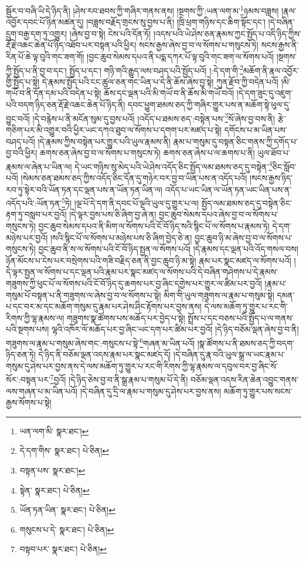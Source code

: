སྦྱོར་བ་བཞི་ཡི་དེ་ཉིད་ནི། །ཤེས་རབ་ཐབས་ཀྱི་གཞིར་གནས་ནས། །སྔགས་ཀྱི་:ཡན་ལག་མ་\footnote{ཡན་ལག་མི་  སྣར་ཐང་། }ཉམས་བཟླས། །རྣལ་འབྱོར་དབང་པོ་ཉིན་མཚན་དུ། །བཟླས་བརྗོད་གྲངས་སུ་བྱས་པ་ནི། །ཁྲི་ཕྲག་གཉིས་དང་ཆིག་སྟོང་དང་། །དེ་བཞིན་དྲུག་བརྒྱ་དག་ཏུ་འགྱུར། །ཞེས་བྱ་བ་སྟེ། ངེས་པའི་དོན་ཏོ། །འདས་པའི་ཡེ་ཤེས་ཅན་རྣམས་ཀྱང་སྤྱོད་པ་འདི་ཉིད་ཀྱིས་རྡོ་རྗེ་འཆང་ཆེན་པོ་ཉིད་འཐོབ་པར་བསྟན་པའི་ཕྱིར། སངས་རྒྱས་ཞེས་བྱ་བ་ལ་སོགས་པ་གསུངས་ཏེ། སངས་རྒྱས་ནི་རིན་པོ་ཆེ་ལྟ་བུའི་གང་ཟག་གོ། །བྱང་ཆུབ་སེམས་དཔའ་ནི་པདྨ་དཀར་པོ་ལྟ་བུའི་གང་ཟག་ལ་སོགས་པའོ། །སྔགས་ཀྱི་སྤྱོད་པ་ནི་བྱ་བ་དང་། སྤྱོད་པ་དང་། གཉི་གའི་རྒྱུད་ལས་བཤད་པའི་སྤྱོད་པའོ། །:དེ་དག་གི་\footnote{དེ་དག་གིས་  སྣར་ཐང་།  པེ་ཅིན། }མཆོག་ནི་རྣལ་འབྱོར་གྱི་སྤྱོད་པ་སྟེ། དེ་རྣམས་སྤྱོད་པའི་ངང་ཚུལ་ཅན་གང་ཡིན་པ་དེ་ནི་ཆོས་ཞེས་བྱ་སྟེ། ཀུན་རྫོབ་ཀྱི་བདེན་པའོ། །མི་གཡོ་བ་ནི་དོན་དམ་པའི་བདེན་པ་སྟེ། ཆོས་དང་ལྡན་པའི་མི་གཡོ་བ་ནི་ཆོས་མི་གཡོ་བའོ། །དེ་དག་ཟུང་དུ་འཇུག་པའི་བདག་ཉིད་ཅན་རྡོ་རྗེ་འཆང་ཆེན་པོ་ཉིད་ནི། དབང་ཕྱུག་ཐམས་ཅད་ཀྱི་གཞིར་གྱུར་པས་ན་མཆོག་སྟེ་ཕུལ་དུ་བྱུང་བའོ། །དེ་བརྙེས་པ་ནི་མངོན་སུམ་དུ་བྱས་པའོ། །འདོད་པ་ཐམས་ཅད་:བསྟེན་པས་\footnote{བསྟན་པས་  སྣར་ཐང་། }སོ་ཞེས་བྱ་བས་ནི། རྩེ་གཅིག་པར་མི་འགྱུར་བའི་ཕྱིར་ཡང་དཀའ་ཐུབ་ལ་སོགས་པ་དགག་པར་མཛད་པ་སྟེ། དགོངས་པ་མ་ཡིན་པས་བཤད་པའོ། །དེ་རྣམས་ཀྱིས་བསྟེན་པར་གྱུར་པའི་ཡུལ་རྣམས་ནི། རྣམ་པ་གསུམ་དུ་བསྟན་ཅིང་གནས་ཀྱི་དགོད་པ་བྱ་བའི་ཕྱིར། ཆགས་ཅན་ཞེས་བྱ་བ་ལ་སོགས་པ་གསུངས་ཏེ། ཆགས་ཅན་ཞེས་པ་ལ་ཆགས་པ་ནི། ཡུལ་ཐོབ་པ་རྣམས་ལ་ཞེན་པ་ཡིན་ལ། དེ་ཡང་གཉིས་སུ་མེད་པའི་ཡེ་ཤེས་འདོད་ཅིང་སྤྱོད་ལམ་ཐམས་ཅད་དུ་བསྟེན་\footnote{སྟེན་  སྣར་ཐང་།  པེ་ཅིན། }ཅིང་སློབ་པའོ། །སེམས་ཅན་ཐམས་ཅད་ཀྱིས་འདོད་ཅིང་དོན་དུ་གཉེར་བར་བྱ་བ་ཡིན་པས་ན་འདོད་པའོ། །སངས་རྒྱས་ཉིད་རབ་ཏུ་སྟེར་བའི་ཡོན་ཏན་དང་ལྡན་པས་ན་ཡོན་ཏན་ཡིན་ལ། འདོད་པ་ཡང་ཡིན་ལ་ཡོན་ཏན་ཡང་ཡིན་པས་ན་འདོད་པའི་:ཡོན་ཏན་\footnote{ཡོན་ཏན་ཡིན་  སྣར་ཐང་།  པེ་ཅིན། }ཏེ། །ལྔ་པོ་དེ་དག་ནི་དབང་པོ་ལྔའི་ཡུལ་དུ་གྱུར་པ་ལ། སྤྱོད་ལམ་ཐམས་ཅད་དུ་བསྟེན་ཅིང་རྟག་ཏུ་བསླབ་པར་བྱའོ། །དེ་ལྟར་བྱས་པས་ཅི་ཞིག་བྱ་ཞེ་ན། བྱང་ཆུབ་སེམས་དཔའ་ཞེས་བྱ་བ་ལ་སོགས་པ་གསུངས་ཏེ། བྱང་ཆུབ་སེམས་དཔའ་ནི་མིག་ལ་སོགས་པའི་ངོ་བོ་ཉིད་སའི་སྙིང་པོ་ལ་སོགས་པ་རྣམས་ཏེ། དེ་དག་མཉེས་པར་བྱའོ། །སའི་སྙིང་པོ་ལ་སོགས་པ་མཉེས་པས་ཅི་ཞིག་བྱེད་ཅེ་ན། བྱང་ཆུབ་ཉི་མ་ཞེས་བྱ་བ་ལ་སོགས་པ་གསུངས་ཏེ། བྱང་ཆུབ་ནི་ས་ལ་སོགས་པའི་ངོ་བོ་ཉིད་སྤྱན་ལ་སོགས་པའོ། །དེ་རྣམས་དང་ལྡན་པའི་འོད་གསལ་བས། ཉོན་མོངས་པ་ངེས་པར་བསྲེགས་པའི་གཟི་བརྗིད་ཅན་ནི་བྱང་ཆུབ་ཉི་མ་སྟེ། རྣམ་པར་སྣང་མཛད་ལ་སོགས་པའོ། །དེ་ལྟར་སྤྱན་ལ་སོགས་པ་དང་ལྡན་པའི་རྣམ་པར་སྣང་མཛད་ལ་སོགས་པའི་དེ་བཞིན་གཤེགས་པ་དེ་རྣམས་གཟུགས་ཀྱི་ཕུང་པོ་ལ་སོགས་པའི་ངོ་བོ་ཉིད་དུ་ཆགས་པར་བྱ་ཞིང་དགྱེས་པར་གྱུར་ལ་ཚིམ་པར་བྱའོ། །རྣམ་པ་གསུམ་པོ་བསྟན་པ་ནི་གཟུགས་ལ་ཞེས་བྱ་བ་ལ་སོགས་པ་སྟེ། མིག་གི་ཡུལ་གཟུགས་ལ་རྣམ་པ་གསུམ་སྟེ། དམན་པ་དང་བར་མ་དང་མཆོག་གསུམ་དུ་རྣམ་པར་ཤེས་ཤིང་རྟོགས་པར་བྱས་ནས། དེ་ལས་མཆོག་ཏུ་གྱུར་པ་རང་གི་རིགས་ཀྱི་ལྷ་རྣམས་ལ། གཟུགས་སྣ་ཚོགས་པས་མཆོད་པར་བྱེད་པ་སྟེ། སྤྲོས་པ་དང་བཅས་པའི་སྤྱོད་པ་ལ་གནས་པའི་སྔགས་པས། ལྷའི་འཁོར་ལོ་མཆོད་པར་བྱ་ཞིང་ཡང་དག་པར་ཚིམ་པར་བྱའོ། །དེ་ཉིད་བཅོམ་ལྡན་ཞེས་བྱ་བ་ནི། གཟུགས་ལ་རྣམ་པ་གསུམ་ཞེས་གང་:གསུངས་པ་སྟེ་\footnote{གསུངས་པ་དེ་  སྣར་ཐང་།  པེ་ཅིན། }གཞན་མ་ཡིན་པའོ། །སྣ་ཚོགས་པ་ནི་ཐམས་ཅད་ཀྱི་བདག་ཉིད་ཅན་ཏེ། དེ་ཉིད་ནི་བཅོམ་ལྡན་འདས་རྣམ་པར་སྣང་མཛད་དོ། །དེ་བཞིན་དུ་རྣ་བའི་ཡུལ་སྒྲ་ལ་ཡང་རྣམ་པ་གསུམ་དུ་ཤེས་པར་བྱས་ནས་དེ་ལས་མཆོག་ཏུ་གྱུར་པ་རང་གི་རིགས་ཀྱི་ལྷ་རྣམས་ལ་དབུལ་བར་བྱ་ཞིང་སོ་སོར་:བསྟན་པར་\footnote{བསྟབ་པར་  སྣར་ཐང་།  པེ་ཅིན། }བྱའོ། །དེ་ཉིད་ཅེས་བྱ་བ་ནི་སྒྲ་རྣམ་པ་གསུམ་པོ་དེ་ནི། བཅོམ་ལྡན་འདས་རིན་ཆེན་འབྱུང་གནས་ལས་གཞན་པ་མ་ཡིན་པའོ། །དེ་བཞིན་དུ་དྲི་ལ་རྣམ་པ་གསུམ་དུ་ཤེས་པར་བྱས་ནས། མཆོག་ཏུ་གྱུར་པས་སངས་རྒྱས་སོགས་པ་སྟེ། 
